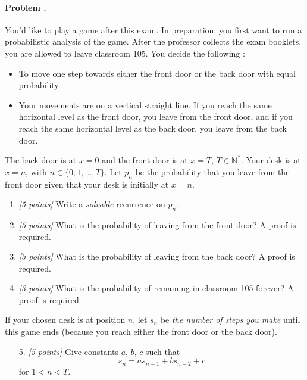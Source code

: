 \documentclass[article,12pt,a4paper]{article}
\newcounter{num}  %
\begin{document}
	\paragraph{Problem \thenum.}	
	You'd like to play a game after this exam. In preparation, you first want to run a probabilistic analysis of the game. 
	After the professor collects the exam booklets, you are allowed to leave classroom 105. 
	You decide the following :
	\begin{itemize}
		\item To move one step towards either the front door or the back door with equal probability.
		\item Your movements are on a vertical straight line. 
		If you reach the same horizontal level as the front door, you leave from the front door, and if you reach the same horizontal level as the back door, you leave from the back door.
	\end{itemize}  
	The back door is at $x=0$ and the front door is at $x=T$, $T\in \mathbb N^*$.
	Your desk is at $x=n$, with $n\in\{0,1,\ldots,T\}$.
	Let $p_n$ be the probability that you leave from the front door given that your desk is initially at $x=n$.
	
	
	\begin{enumerate}
		\item \textit{[5 points]} Write a \textit{solvable} recurrence on $p_n$.
		
		\vspace{7cm}
		
		
		\item \textit{[5 points]} What is the probability of leaving from the front door? A proof is required.
		
		
		\newpage
		
		\item \textit{[3 points]} What is the probability of leaving from the back door? A proof is required.
		
		\vspace{14cm}
		
		
		\item \textit{[3 points]} What is the probability of remaining in classroom 105 forever? A proof is required.
		
		
	\end{enumerate}
	\newpage
	
	If your chosen desk is at position $n$, let $s_n$ be \textit{the number of steps you make} until this game ends (because you reach either the front door or the back door).
	\begin{enumerate}
		\item[5.] \textit{[5 points]} Give constants $a$, $b$, $c$ such that
		\begin{equation}\label{eq:rec}
			s_n = a s_{n-1} + b s_{n-2} + c 
		\end{equation}
		for $1 < n < T$.
	\end{enumerate}
	
\end{document}
